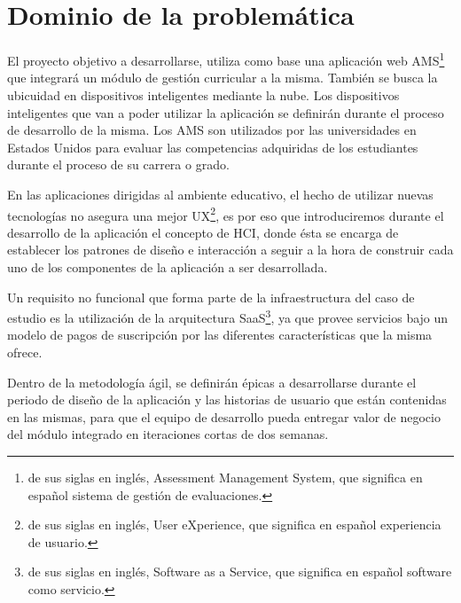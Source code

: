 \section{Dominio de la problemática}
El proyecto objetivo a desarrollarse, utiliza como base una aplicación web AMS\footnote{de sus siglas en inglés, Assessment Management System, que significa en español sistema de gestión de evaluaciones.} que integrará un módulo de gestión curricular a la misma. También se busca la ubicuidad en dispositivos inteligentes mediante la nube. Los dispositivos inteligentes que van a poder utilizar la aplicación se definirán durante el proceso de desarrollo de la misma. Los AMS son utilizados por las universidades en Estados Unidos para evaluar las competencias adquiridas de los estudiantes durante el proceso de su carrera o grado.

En las aplicaciones dirigidas al ambiente educativo, el hecho de utilizar nuevas tecnologías no asegura una mejor UX\footnote{de sus siglas en inglés, User eXperience, que significa en español experiencia de usuario.}, es por eso que introduciremos durante el desarrollo de la aplicación el concepto de HCI\citep{lazar_research_2010}, donde ésta se encarga de establecer los patrones de diseño e interacción a seguir a la hora de construir cada uno de los componentes de la aplicación a ser desarrollada.

Un requisito no funcional que forma parte de la infraestructura del caso de estudio es la utilización de la arquitectura SaaS\footnote{de sus siglas en inglés, Software as a Service, que significa en español software como servicio.}, ya que provee servicios bajo un modelo de pagos de suscripción por las diferentes características que la misma ofrece.

Dentro de la metodología ágil, se definirán épicas a desarrollarse durante el periodo de diseño de la aplicación y las historias de usuario que están contenidas en las mismas, para que el equipo de desarrollo pueda entregar valor de negocio del módulo integrado en iteraciones cortas de dos semanas.